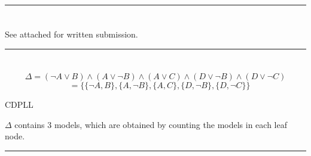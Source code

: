 \documentclass{article}
\begin{document}
\noindent\rule{16cm}{0.4pt}
\section{}
See attached for written submission.

\noindent\rule{16cm}{0.4pt}
\section{}
\[\Delta = (\lnot A \lor B) \land
            (A \lor \lnot B) \land
            (A \lor C) \land
            (D \lor \lnot B) \land
            (D \lor \lnot C) \]
\[\quad =  \{\{\lnot A , B\} ,
            \{A , \lnot B\} ,
            \{A , C\} ,
            \{D , \lnot B\} ,
            \{D , \lnot C\}\} \]
\newline
\begin{center}
CDPLL
\end{center}
\begin{center}
\newline
$\Delta$ contains 3 models, which are obtained by counting the models in each leaf node.
\end{center}

\noindent\rule{16cm}{0.4pt}
\end{document}
